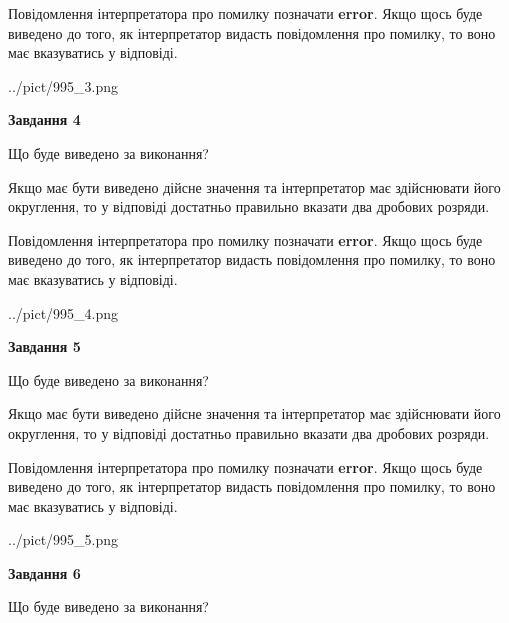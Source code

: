 \documentclass[12pt, ukrainian]{article}
\begin{document}
{\begin {Large}
Повідомлення інтерпретатора про помилку позначати \textbf{error}.
Якщо щось буде виведено до того, як інтерпретатор видасть повідомлення про помилку, 
то воно має вказуватись у відповіді. \par

\begin{center}
	{../pict/995_3.png}
\end{center}
\newpage

{\begin {center}\textbf{Завдання 4}\end {center}}\par
Що буде виведено за виконання? \par

Якщо має бути виведено дійсне значення та інтерпретатор має здійснювати його округлення, 
то у відповіді достатньо правильно вказати два дробових розряди.

Повідомлення інтерпретатора про помилку позначати \textbf{error}.
Якщо щось буде виведено до того, як інтерпретатор видасть повідомлення про помилку, 
то воно має вказуватись у відповіді. \par

\begin{center}
	{../pict/995_4.png}
\end{center}
\newpage

{\begin {center}\textbf{Завдання 5}\end {center}}\par
Що буде виведено за виконання? \par

Якщо має бути виведено дійсне значення та інтерпретатор має здійснювати його округлення, 
то у відповіді достатньо правильно вказати два дробових розряди.

Повідомлення інтерпретатора про помилку позначати \textbf{error}.
Якщо щось буде виведено до того, як інтерпретатор видасть повідомлення про помилку, 
то воно має вказуватись у відповіді. \par

\begin{center}
	{../pict/995_5.png}
\end{center}
\newpage

{\begin {center}\textbf{Завдання 6}\end {center}}\par
Що буде виведено за виконання? \par


\end{Large}}
\end{document}
